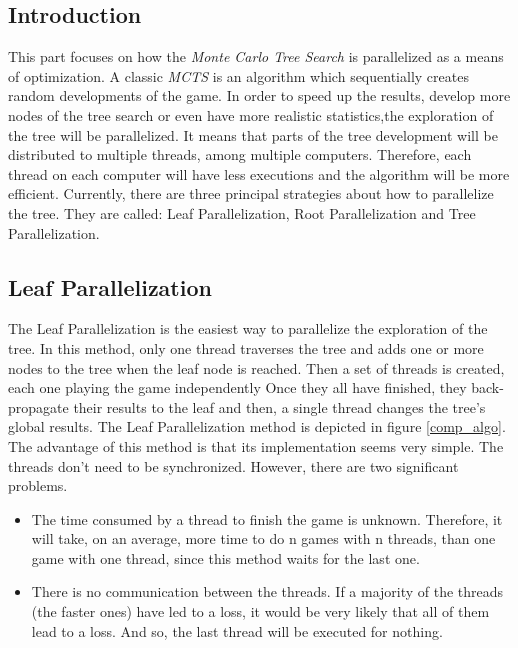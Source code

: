 \label{third part}
\subsection{Introduction}

This part focuses on how the \emph{Monte Carlo Tree Search} is parallelized as a means of optimization. A classic \emph{MCTS} is an algorithm which sequentially creates random developments of the game. In order to speed up the results, develop more nodes of the tree search or even have more realistic statistics,the exploration of the tree will be parallelized. It means that parts of the tree development will be distributed to multiple threads, among multiple computers. Therefore, each thread on each computer will have less executions and the algorithm will be more efficient.
\newline
\newline
Currently, there are three principal strategies about how to parallelize the tree. They are called: Leaf Parallelization, Root Parallelization and Tree Parallelization\cite{parallel_comp, master_mcts_kozeleck}.

\subsection{Leaf Parallelization}
\label{sec:leaf}

The Leaf Parallelization is the easiest way to parallelize the exploration of the tree. In this method, only one thread traverses the tree and adds one or more nodes to the tree when the leaf node is reached. Then a set of threads is created, each one playing the game independently Once they all have finished, they back-propagate their results to the leaf and then, a single thread changes the tree’s global results. The Leaf Parallelization method is depicted in figure \ref{comp_algo}.
\newline
\newline
The advantage of this method is that its implementation seems very simple. The threads don't need to be synchronized. However, there are two significant problems.
\begin{itemize}
     \item The time consumed by a thread to finish the game is unknown. Therefore, it will take, on an average, more time to do n games with n threads, than one game with one thread, since this method waits for the last one.
     \item There is no communication between the threads. If a majority of the threads (the faster ones) have led to a loss, it would be very likely that all of them lead to a loss. And so, the last thread will be executed for nothing. 
  \end{itemize}

